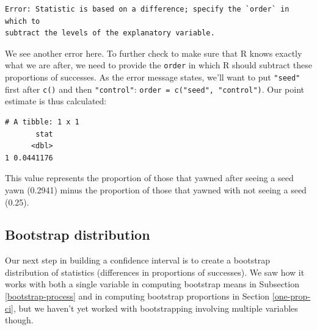 \documentclass[12pt, krantz2,]{krantz}
\makeatletter
\newenvironment{Shaded}{\begin{snugshade}}{\end{snugshade}}
\newcommand{\DataTypeTok}[1]{\textcolor[rgb]{0.27,0.27,0.27}{#1}}
\newcommand{\KeywordTok}[1]{\textcolor[rgb]{0.27,0.27,0.27}{\textbf{#1}}}
\newcommand{\NormalTok}[1]{#1}
\newcommand{\OperatorTok}[1]{\textcolor[rgb]{0.43,0.43,0.43}{\textbf{#1}}}
\newcommand{\StringTok}[1]{\textcolor[rgb]{0.5,0.5,0.5}{#1}}
\newenvironment{kframe}{%
\medskip{}
\setlength{\fboxsep}{.8em}
 \def\at@end@of@kframe{}%
 \ifinner\ifhmode%
  \def\at@end@of@kframe{\end{minipage}}%
  \begin{minipage}{\columnwidth}%
 \fi\fi%
 \def\FrameCommand##1{\hskip\@totalleftmargin \hskip-\fboxsep
 \colorbox{shadecolor}{##1}\hskip-\fboxsep
     \hskip-\linewidth \hskip-\@totalleftmargin \hskip\columnwidth}%
 \MakeFramed {\advance\hsize-\width
   \@totalleftmargin\z@ \linewidth\hsize
   \@setminipage}}%
 {\par\unskip\endMakeFramed%
 \at@end@of@kframe}
\renewenvironment{Shaded}{\begin{kframe}}{\end{kframe}}
\makeatother
\begin{document}
\begin{verbatim}
Error: Statistic is based on a difference; specify the `order` in which to
subtract the levels of the explanatory variable.
\end{verbatim}

We see another error here. To further check to make sure that R knows exactly what we are after, we need to provide the \texttt{order} in which R should subtract these proportions of successes. As the error message states, we'll want to put \texttt{"seed"} first after \texttt{c()} and then \texttt{"control"}: \texttt{order\ =\ c("seed",\ "control")}. Our point estimate is thus calculated:

\begin{Shaded}
\end{Shaded}

\begin{verbatim}
# A tibble: 1 x 1
       stat
      <dbl>
1 0.0441176
\end{verbatim}

This value represents the proportion of those that yawned after seeing a seed yawn (0.2941) minus the proportion of those that yawned with not seeing a seed (0.25).

\hypertarget{bootstrap-distribution}{%
\subsection{Bootstrap distribution}\label{bootstrap-distribution}}

Our next step in building a confidence interval is to create a bootstrap distribution of statistics (differences in proportions of successes). We saw how it works with both a single variable in computing bootstrap means in Subsection \ref{bootstrap-process} and in computing bootstrap proportions in Section \ref{one-prop-ci}, but we haven't yet worked with bootstrapping involving multiple variables though.
\end{document}
